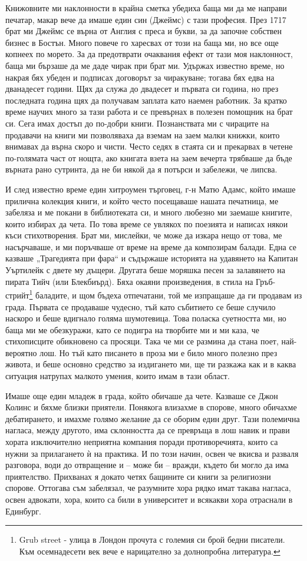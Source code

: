 \documentclass[12pt]{book}
\begin{document}
Книжовните ми наклонности в крайна сметка убедиха баща ми да ме направи печатар, макар вече да имаше един син (Джеймс) с тази професия. През 1717 брат ми Джеймс се върна от Англия с преса и букви, за да започне собствен бизнес в Бостън. Много повече го харесвах от този на баща ми, но все още копнеех по морето. За да предотврати очаквания ефект от тази моя наклонност, баща ми бързаше да ме даде чирак при брат ми. Удържах известно време, но накрая бях убеден и подписах договорът за чиракуване; тогава бях едва на дванадесет години. Щях да служа до двадесет и първата си година, но през последната година щях да получавам заплата като наемен работник. За кратко време научих много за тази работа и се превърнах в полезен помощник на брат си. Сега имах достъп до по-добри книги. Познанствата ми с чираците на продавачи на книги ми позволяваха да вземам на заем малки книжки, които внимавах да върна скоро и чисти. Често седях в стаята си и прекарвах в четене по-голямата част от нощта, ако книгата взета на заем вечерта трябваше да бъде върната рано сутринта, да не би някой да я потърси и забележи, че липсва.

И след известно време един хитроумен търговец, г-н Матю Адамс, който имаше прилична колекция книги, и който често посещаваше нашата печатница, ме забеляза и ме покани в библиотеката си, и много любезно ми заемаше книгите, които избирах да чета. По това време се увлякох по поезията и написах някои къси стихотворения. Брат ми, мислейки, че може да изкара нещо от това, ме насърчаваше, и ми поръчваше от време на време да композирам балади. Една се казваше „Трагедията при фара“ и съдържаше историята на удавянето на Капитан Уъртилейк с двете му дъщери. Другата беше моряшка песен за залавянето на пирата Тийч (или Блекбиърд). Бяха окаяни произведения, в стила на Гръб-стрийт\footnote{Grub street - улица в Лондон прочута с големия си брой бедни писатели. Към осемнадесети век вече е нарицателно за долнопробна литература.} баладите, и щом бъдеха отпечатани, той ме изпращаше да ги продавам из града. Първата се продаваше чудесно, тъй като събитието се беше случило наскоро и беше вдигнало голяма шумотевица. Това поласка суетността ми, но баща ми ме обезкуражи, като се подигра на творбите ми и ми каза, че стихописците обикновено са просяци. Така че ми се размина да стана поет, най-вероятно лош. Но тъй като писането в проза ми е било много полезно през живота, и беше основно средство за издигането ми, ще ти разкажа как и в каква ситуация натрупах малкото умения, които имам в тази област. 

Имаше още един младеж в града, който обичаше да чете. Казваше се Джон Колинс и бяхме близки приятели. Понякога влизахме в спорове, много обичахме дебатирането, и имахме голямо желание да се оборим един друг. Тази полемична нагласа, между другото, има склонността да се превръща в лош навик и прави хората изключително неприятна компания поради противоречията, които са нужни за прилагането ѝ на практика. И по този начин, освен че вкисва и разваля разговора, води до отвращение и – може би – вражди, където би могло да има приятелство. Прихванах я докато четях бащините си книги за религиозни спорове. Оттогава съм забелязал, че разумните хора рядко имат такава нагласа, освен адвокати, хора, които са били в университет и всякакви хора отраснали в Единбург.
 
\end{document}
